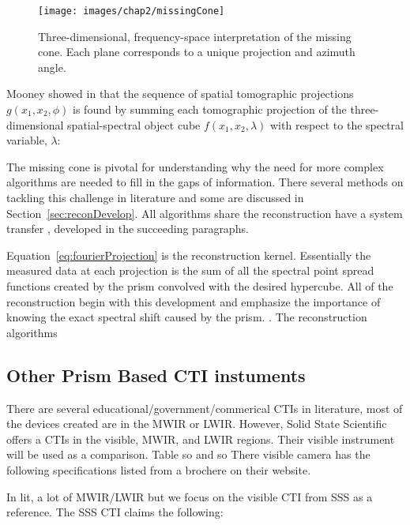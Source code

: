 \begin{figure}[htb]
\begin{center}
\label{fig:missingCone}
\texttt{[image: images/chap2/missingCone]}
\caption{Three-dimensional, frequency-space interpretation of the missing cone. Each plane corresponds to a unique projection and azimuth angle.\cite{Descour}}
\end{center}
\end{figure}

Mooney showed in \cite{Mooney95} that the sequence of spatial tomographic projections $g(x_1,x_2,\phi)$ is found by summing each tomographic projection of the three-dimensional spatial-spectral object cube $f(x_1,x_2,\lambda)$ with respect to the spectral variable, $\lambda$:

The missing cone is pivotal for understanding why the need for more complex algorithms are needed to fill in the gaps of information. There several methods on tackling this challenge in literature and some are discussed in Section~\ref{sec:reconDevelop}. All algorithms share the reconstruction have a system transfer , developed in the succeeding paragraphs. 

Equation~\eqref{eq:fourierProjection} is the reconstruction kernel. Essentially the measured data at each projection is the sum of all the spectral point spread functions created by the prism convolved with the desired hypercube. All of the reconstruction begin with this development and emphasize the importance of knowing the exact spectral shift caused by the prism. . The reconstruction algorithms 

\subsection{Other Prism Based CTI instuments}

There are several educational/government/commerical CTIs in literature, most of the devices created are in the MWIR or LWIR. However, Solid State Scientific offers a CTIs in the visible, MWIR, and LWIR regions. Their visible instrument will be used as a comparison. Table so and so There visible camera has the following specifications listed from a brochere on their website\cite{SSSBrochere}.



In lit, a lot of MWIR/LWIR but we focus on the visible CTI from SSS as a reference. The SSS CTI claims the following:


